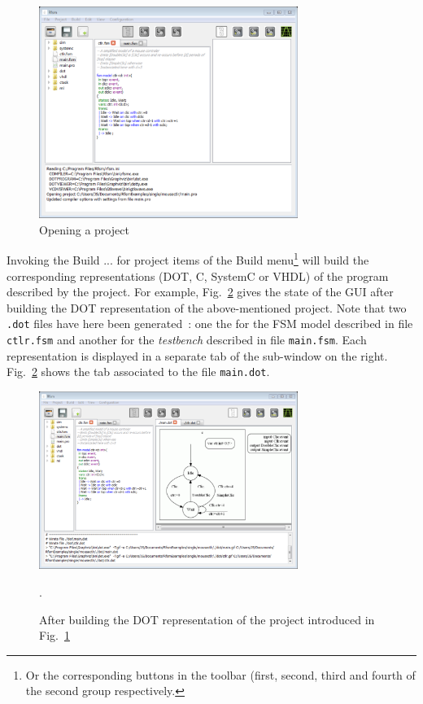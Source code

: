 \begin{figure}[h]
  \centering
  \includegraphics[width=0.75\textwidth]{figs/gui/open-project}
  \caption{Opening a project}
  \label{fig:open-project}
\end{figure}

Invoking the \textsf{Build ... for project} items of the \textsf{Build} menu\footnote{Or the
  corresponding buttons in the toolbar (first, second, third and fourth of the second group
  respectively.} will build the corresponding representations (DOT, C, SystemC or VHDL) of the
program described by the project.  For example, Fig.~\ref{fig:make-dot-project} gives the state of
the GUI after building the DOT representation of the above-mentioned project. Note that two
\verb|.dot| files have here been generated~: one the for the FSM model described in file
\verb|ctlr.fsm| and another for the \emph{testbench} described in file \verb|main.fsm|. Each
representation is displayed in a separate tab of the sub-window on the
right. Fig.~\ref{fig:make-dot-project} shows the tab associated to the file \verb|main.dot|. 

\begin{figure}[h]
  \centering
  \includegraphics[width=0.75\textwidth]{figs/gui/make-dot-project}
  \caption{After building the DOT representation of the project introduced in
    Fig.~\ref{fig:open-project}}.
  \label{fig:make-dot-project}
\end{figure}


